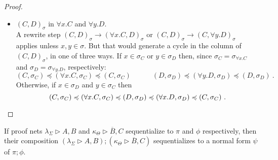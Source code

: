 \documentclass[UKenglish]{lipics-v2016}
\theoremstyle{plain}
\newcommand\+{+}
\renewcommand\*{\times}
\newcommand\dual[1]{\overline{#1}}
\newcommand\dep{\preccurlyeq}
\newcommand\net[3]{#1\triangleright #2,#3}
\newcommand\comp{\mathbin;}
\newcommand\link[3][\sigma]{(#2,#3)_{#1}}
\newcommand\scoal{\rightarrow} %
\begin{document}
\begin{proof}
\begin{itemize}
	\item 
$\link CD$ in $\forall x.C$ and $\forall y.D$.
\\
A rewrite step $\link CD\scoal\link{\forall x.C}D$ or $\link CD\scoal\link C{\forall y.D}$ applies unless $x,y\in\sigma$. But that would generate a cycle in the column of $\link CD$, in one of three ways. If $x\in\sigma_C$ or $y\in\sigma_D$ then, since $\sigma_C=\sigma_{\forall x.C}$ and $\sigma_D=\sigma_{\forall y.D}$, respectively:
\[
	(C,\sigma_C)\dep(\forall x.C,\sigma_C)\dep(C,\sigma_C)
\qquad\quad
	(D,\sigma_D)\dep(\forall y.D,\sigma_D)\dep(D,\sigma_D)~.
\]
Otherwise, if $x\in\sigma_D$ and $y\in\sigma_C$ then
\[
	(C,\sigma_C)\dep(\forall x.C,\sigma_C)\dep(D,\sigma_D)\dep(\forall x.D,\sigma_D)\dep(C,\sigma_C)~.
\qedhere
\]
\end{itemize}
\end{proof}


\setcounter{theorem}{\thethmcomposition}
\begin{theorem}[Restatement]
If proof nets $\net{\lambda_\Sigma}AB$ and $\net{\kappa_\Theta}{\dual B}C$ sequentialize to $\pi$ and $\phi$ respectively, then their composition $(\net{\lambda_\Sigma}AB)\comp(\net{\kappa_\Theta}{\dual B}C)$ sequentializes to a normal form $\psi$ of $\pi\comp\phi$.
\end{theorem}
\end{document}

